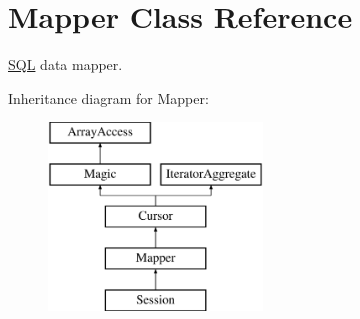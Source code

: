 \hypertarget{class_d_b_1_1_s_q_l_1_1_mapper}{}\section{Mapper Class Reference}
\label{class_d_b_1_1_s_q_l_1_1_mapper}


\hyperlink{class_d_b_1_1_s_q_l}{S\+QL} data mapper.  


Inheritance diagram for Mapper\+:\begin{figure}[H]
\begin{center}
\leavevmode
\includegraphics[height=5.000000cm]{class_d_b_1_1_s_q_l_1_1_mapper}
\end{center}
\end{figure}

